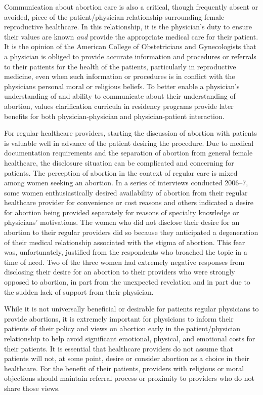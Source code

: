 \documentclass[letterpaper, 12pt]{article}
\begin{document}
Communication about abortion care is also a critical, though frequently absent or avoided, piece of the patient/physician relationship surrounding female reproductive healthcare. In this relationship, it is the physician's duty to ensure their values are known \textit{and} provide the appropriate medical care for their patient.
It is the opinion of the American College of Obstetricians and Gynecologists that a physician is obliged to provide accurate information and procedures or referrals to their patients for the health of the patients, particularly in reproductive medicine, even when such information or procedures is in conflict with the physicians personal moral or religious beliefs. \autocite[pg. 1]{_limits_2007}
To better enable a physician's understanding of and ability to communicate about their understanding of abortion, values clarification curricula in residency programs provide later benefits for both physician-physician and physician-patient interaction. \autocite[pg. 150]{freedman_obstacles_2010}

For regular healthcare providers, starting the discussion of abortion with patients is valuable well in advance of the patient desiring the procedure.
Due to medical documentation requirements and the separation of abortion from general female healthcare, the disclosure situation can be complicated and concerning for patients. \autocite[pg. 410, 412]{weitz_abortion_2010}
The perception of abortion in the context of regular care is mixed among women seeking an abortion.
In a series of interviews conducted 2006--7, some women enthusiastically desired availability of abortion from their regular healthcare provider for convenience or cost reasons and others indicated a desire for abortion being provided separately for reasons of specialty knowledge or physicians' motivations. \autocite[pg. 411--2]{weitz_abortion_2010}
The women who did not disclose their desire for an abortion to their regular providers did so because they anticipated a degeneration of their medical relationship associated with the stigma of abortion. \autocite[pg. 412]{weitz_abortion_2010}
This fear was, unfortunately, justified from the respondents who broached the topic in a time of need.
Two of the three women had extremely negative responses from disclosing their desire for an abortion to their providers who were strongly opposed to abortion, in part from the unexpected revelation and in part due to the sudden lack of support from their physician. \autocite[pg. 412-3]{weitz_abortion_2010}

While it is not universally beneficial or desirable for patients regular physicians to provide abortions, it is extremely important for physicians to inform their patients of their policy and views on abortion early in the patient/physician relationship to help avoid significant emotional, physical, and emotional costs for their patients. \autocite[pg. 413]{weitz_abortion_2010}
It is essential that healthcare providers do not assume that patients will not, at some point, desire or consider abortion as a choice in their healthcare.
For the benefit of their patients, providers with religious or moral objections should maintain referral process or proximity to providers who do not share those views. \autocite[pg. 1]{_limits_2007}
\end{document}
